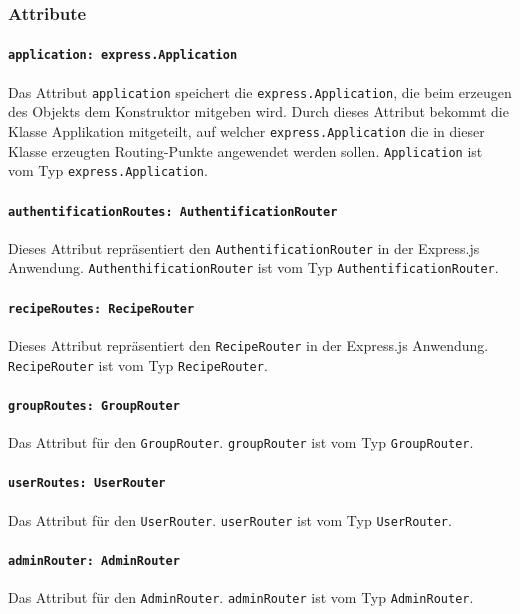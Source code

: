 \documentclass{entwurfsheft}
\begin{document}
\subsubsection*{Attribute}
\paragraph{\texttt{application: express.Application}}
Das Attribut \texttt{application} speichert die \newline
\texttt{express.Application}, die beim erzeugen des Objekts dem Konstruktor mitgeben wird.
Durch dieses Attribut bekommt die Klasse Applikation mitgeteilt, auf welcher \texttt{express.Application} die in dieser Klasse erzeugten Routing-Punkte angewendet werden sollen.
\texttt{Application} ist vom Typ \texttt{express.Application}.
\paragraph{\texttt{authentificationRoutes: AuthentificationRouter}}
Dieses Attribut repräsentiert den \newline
\texttt{AuthentificationRouter} in der Express.js Anwendung. \texttt{AuthenthificationRouter} ist vom Typ \texttt{AuthentificationRouter}.
\paragraph{\texttt{recipeRoutes: RecipeRouter}}
Dieses Attribut repräsentiert den \texttt{RecipeRouter} in der Express.js Anwendung. \texttt{RecipeRouter} ist vom Typ \texttt{RecipeRouter}.
\paragraph{\texttt{groupRoutes: GroupRouter}}
Das Attribut für den \texttt{GroupRouter}. \texttt{groupRouter} ist vom \newline
Typ \texttt{GroupRouter}.
\paragraph{\texttt{userRoutes: UserRouter}}
Das Attribut für den \texttt{UserRouter}. \texttt{userRouter} ist vom Typ \newline
\texttt{UserRouter}.
\paragraph{\texttt{adminRouter: AdminRouter}}
Das Attribut für den \texttt{AdminRouter}. \texttt{adminRouter} ist vom Typ \texttt{AdminRouter}.
\end{document}
